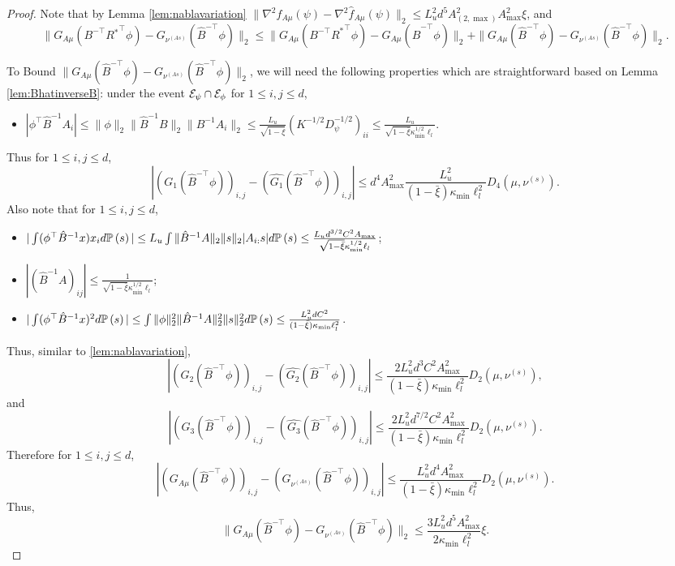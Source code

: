 \begin{proof}
Note that by Lemma \ref{lem:nablavariation} $\|\nabla^2 f_{A\mu}(\psi) - \nabla^2 \widehat{f}_{A\mu}(\psi)\|_2 \le L_u^2  d^5 A_{(2,\max)}^2A_{\max}^2\xi$, and 
\[
\|G_{A\mu}(B^{-\top}R{^*}^{\top}\phi) - G_{\nu^{(As)}}(\hat{B}^{-\top}\phi)\|_2
\le 
\|G_{A\mu}(B^{-\top}{R^*}^{\top}\phi) - G_{A\mu}(\hat{B}^{-\top}\phi)\|_2
+ \|G_{A\mu}(\hat{B}^{-\top}\phi) - G_{\nu^{(As)}}(\hat{B}^{-\top}\phi)\|_2.
\]

To Bound $\|G_{A\mu}(\hat{B}^{-\top}\phi) - G_{\nu^{(As)}}(\hat{B}^{-\top}\phi)\|_2$, we will need the following properties which are straightforward based on Lemma \ref{lem:BhatinverseB}: 
under the event $ \mathcal{E}_{\psi}\cap \mathcal{E}_{\phi} $ for $1\le i, j\le d$,
\begin{itemize}
\item $|\phi^{\top}\hat{B}^{-1}A_i| \le \|\phi\|_2\|\hat{B}^{-1}B\|_2\|B^{-1}A_i\|_2\le
 \frac{L_u}{\sqrt{1-\bar{\xi}}} (K^{-1/2}D^{-1/2}_{\psi})_{ii} \le
 \frac{L_u}{\sqrt{1-\bar{\xi}}\kappa_{\min}^{1/2}\ell_l}$.
\end{itemize}
Thus for $1\le i, j\le d$,
\[
|(G_1(\hat{B}^{-\top}\phi))_{i,j} - (\hat{G_1}(\hat{B}^{-\top}\phi))_{i,j}| \le
d^4A^2_{\max}\frac{L_u^2}{(1-\bar{\xi})\kappa_{\min}\ell_l^2}D_4(\mu,\nu^{(s)}).
\]
Also note that for $1\le i, j\le d$,
\begin{itemize}
\item $|\int(\phi^{\top}\hat{B}^{-1}x)x_i d\mathbb{P}\left(s\right)| 
\le L_u\int \|\hat{B}^{-1}A\|_2\|s\|_2 |A_{i:}s| d\mathbb{P}\left(s\right)
\le \frac{L_ud^{3/2}C^2A_{\max}}{\sqrt{1-\bar{\xi}}\kappa_{\min}^{1/2}\ell_l}$; 
\item $|(\hat{B}^{-1}A)_{ij}| \le \frac{1}{\sqrt{1-\bar{\xi}}\kappa_{\min}^{1/2}\ell_l}$;
\item $|\int(\phi^{\top}\hat{B}^{-1}x)^2 d\mathbb{P}\left(s\right)|\le
 \int \|\phi\|_2^2 \|\hat{B}^{-1}A\|_2^2\|s\|_2^2 d\mathbb{P}\left(s\right) \le \frac{L_u^2dC^2}{(1-\bar{\xi})\kappa_{\min}\ell_l^2}$.
\end{itemize}
Thus, similar to \ref{lem:nablavariation},
\[
|(G_2(\hat{B}^{-\top}\phi))_{i,j} - (\hat{G_2}(\hat{B}^{-\top}\phi))_{i,j}| \le
\frac{2L_u^2d^3C^2A^2_{\max}}{(1-\bar{\xi})\kappa_{\min}\ell_l^2}D_2(\mu,\nu^{(s)}),
\]
and 
\[
|(G_3(\hat{B}^{-\top}\phi))_{i,j} - (\hat{G_3}(\hat{B}^{-\top}\phi))_{i,j}| \le
\frac{2L_u^2d^{7/2}C^2A^2_{\max}}{(1-\bar{\xi})\kappa_{\min}\ell_l^2}D_2(\mu,\nu^{(s)}).
\]
Therefore for $1\le i,j\le d$,
\[
\left|\left(G_{A\mu}(\hat{B}^{-\top}\phi)\right)_{i,j} - \left(G_{\nu^{(As)}}(\hat{B}^{-\top}\phi)\right)_{i,j}\right| 
\le
\frac{L_u^2d^4A^2_{\max}}{(1-\bar{\xi})\kappa_{\min}\ell_l^2}D_2(\mu,\nu^{(s)}). 
\]
Thus, 
\begin{equation}
\label{eq:fBhatfhatBhat}
 \|G_{A\mu}(\hat{B}^{-\top}\phi) - G_{\nu^{(As)}}(\hat{B}^{-\top}\phi)\|_2 \le 
\frac{3L_u^2d^5A^2_{\max}}{2\kappa_{\min}\ell_l^2}\xi.
\end{equation}


\end{proof}
